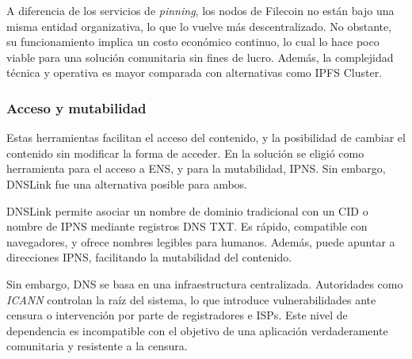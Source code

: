 A diferencia de los servicios de \textit{pinning}, los nodos de Filecoin no están bajo una misma entidad organizativa, lo que lo vuelve más descentralizado. No obstante, su funcionamiento implica un costo económico continuo, lo cual lo hace poco viable para una solución comunitaria sin fines de lucro. Además, la complejidad técnica y operativa es mayor comparada con alternativas como IPFS Cluster.

\subsubsection{Acceso y mutabilidad}

Estas herramientas facilitan el acceso del contenido, y la posibilidad de cambiar el contenido sin modificar la forma de acceder. En la solución se eligió como herramienta para el acceso a ENS, y para la mutabilidad, IPNS. Sin embargo, DNSLink fue una alternativa posible para ambos.

DNSLink \cite{dnslink} permite asociar un nombre de dominio tradicional con un CID o nombre de IPNS mediante registros DNS TXT. Es rápido, compatible con navegadores, y ofrece nombres legibles para humanos. Además, puede apuntar a direcciones IPNS, facilitando la mutabilidad del contenido.

Sin embargo, DNS se basa en una infraestructura centralizada. Autoridades como \textit{ICANN} controlan la raíz del sistema, lo que introduce vulnerabilidades ante censura o intervención por parte de registradores e ISPs. Este nivel de dependencia es incompatible con el objetivo de una aplicación verdaderamente comunitaria y resistente a la censura.
